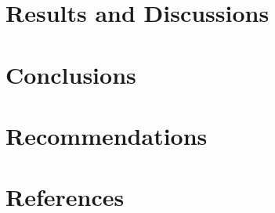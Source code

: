 \documentclass{book}
\begin{document}
\chapter{Results and Discussions}
\label{cha:results-discussions}

%

\chapter{Conclusions}
\label{cha:conclusions}


\chapter{Recommendations}
\label{cha:recommendations}



\chapter{References}
\label{cha:references}



\appendix{}
\renewcommand{\thechapter}{\Alph{chapter}}

\end{document}
